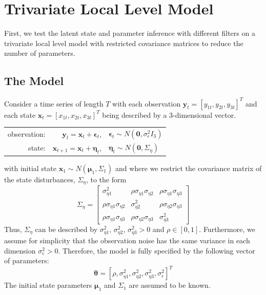 \documentclass[11pt, oneside]{scrreprt}   	%
\begin{document}
\section{Trivariate Local Level Model}
First, we test the latent state and parameter inference with different filters on a trivariate local level model with restricted covariance matrices to reduce the number of parameters. 

\subsection{The Model}
Consider a time series of length $T$ with each observation $\boldsymbol{y}_t=[y_{1t}, y_{2t}, y_{3t}]^T$ and each state $\boldsymbol{x}_t=[x_{1t}, x_{2t}, x_{3t}]^T$ being described by a 3-dimensional vector.

\bigskip
\begin{center}
\begin{tabular}{ r r l }
  observation: & $\boldsymbol{y}_t = \boldsymbol{x}_t + \boldsymbol{\epsilon}_t$, & $\boldsymbol{\epsilon}_t \sim N(\textbf{0}, \sigma_{\epsilon}^2 I_3)$ \\
  state: & $\boldsymbol{x}_{t+1} = \boldsymbol{x}_t + \boldsymbol{\eta}_t$, & $\boldsymbol{\eta}_t \sim N(\textbf{0}, \Sigma_{\eta})$ \\
\end{tabular}
\end{center}
\bigskip
with initial state $\boldsymbol{x}_1 \sim N(\boldsymbol{\mu}_1, \Sigma_1)$ and where we restrict the covariance matrix of the state disturbances, $\Sigma_{\eta}$, to the form
$$
\Sigma_{\eta} = 
\begin{bmatrix}
\sigma_{\eta 1}^2 & \rho \sigma_{\eta 1} \sigma_{\eta 2} & \rho \sigma_{\eta 1} \sigma_{\eta 3}
\\ \rho \sigma_{\eta 1} \sigma_{\eta 2} & \sigma_{\eta 2}^2 & \rho \sigma_{\eta 2} \sigma_{\eta 3}
\\ \rho \sigma_{\eta 1} \sigma_{\eta 3} & \rho \sigma_{\eta 2} \sigma_{\eta 3} & \sigma_{\eta 3}^2
\end{bmatrix}
$$
Thus, $\Sigma_{\eta}$ can be described by $\sigma_{\eta 1}^2$, $\sigma_{\eta 2}^2$, $\sigma_{\eta 3}^2 > 0$ and $\rho \in [0,1]$. Furthermore, we assume for simplicity that the observation noise has the same variance in each dimension $\sigma_{\epsilon}^2 > 0$. Therefore, the model is fully specified by the following vector of parameters:
$$
\boldsymbol{\theta} = [\rho, \sigma_{\eta 1}^2, \sigma_{\eta 2}^2, \sigma_{\eta 3}^2, \sigma_{\epsilon}^2]^T
$$
The initial state parameters $\boldsymbol{\mu}_1$ and $\Sigma_1$ are assumed to be known.
\end{document}
